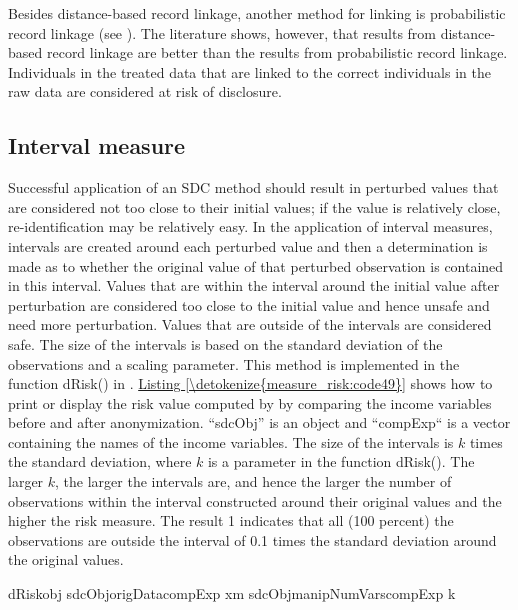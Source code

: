\documentclass[letterpaper,10pt,english]{sphinxmanual}
\begin{document}
Besides distance-based record linkage, another method for linking is
probabilistic record linkage (see {\hyperref[\detokenize{measure_risk:doto03}]{}}). The
literature shows, however, that results from distance-based record
linkage are better than the results from probabilistic record linkage.
Individuals in the treated data that are linked to the correct
individuals in the raw data are considered at risk of disclosure.


\subsection{Interval measure}
\label{\detokenize{measure_risk:interval-measure}}
Successful application of an SDC method should result in perturbed
values that are considered not too close to their initial values; if the
value is relatively close, re-identification may be relatively easy. In
the application of interval measures, intervals are created around each
perturbed value and then a determination is made as to whether the
original value of that perturbed observation is contained in this
interval. Values that are within the interval around the initial value
after perturbation are considered too close to the initial value and
hence unsafe and need more perturbation. Values that are outside of the
intervals are considered safe. The size of the intervals is based on the
standard deviation of the observations and a scaling parameter. This
method is implemented in the function dRisk() in . \hyperref[\detokenize{measure_risk:code49}]{Listing \ref{\detokenize{measure_risk:code49}}}
shows how to print or display the risk value computed by  by
comparing the income variables before and after anonymization. “sdcObj”
is an  object and “compExp“ is a vector containing the names
of the income variables. The size of the intervals is \(k\) times
the standard deviation, where \(k\) is a parameter in the function
dRisk(). The larger \(k\), the larger the intervals are, and hence
the larger the number of observations within the interval constructed
around their original values and the higher the risk measure. The result
1 indicates that all (100 percent) the observations are outside the
interval of 0.1 times the standard deviation around the original values.

\def\sphinxLiteralBlockLabel{\label{\detokenize{measure_risk:code49}}}
%
\begin{sphinxVerbatim}[commandchars=\\\{\},numbers=left,firstnumber=1,stepnumber=1]
 dRiskobj  sdcObjorigData\PYG{p}{[}compExp\PYG{p}{]} xm  sdcObjmanipNumVars\PYG{p}{[}compExp\PYG{p}{]} k  
 \PYG{p}{[}\PYG{p}{]} 
\end{sphinxVerbatim}
\end{document}
